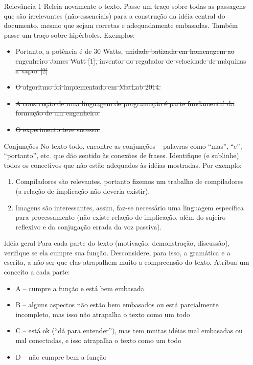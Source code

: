 \documentclass{beamer}
\begin{document}
\begin{frame}[fragile]{Relevância 1}
  \centering
  \large
  Releia novamente o texto. Passe um traço sobre todas as passagens que são
  irrelevantes (não-essenciais) para a construção da idéia central do documento,
  mesmo que sejam corretas e adequadamente embasadas. Também passe um traço
  sobre hipérboles. Exemplos:
  \begin{itemize}
    \item Portanto, a potência é de 30 Watts, \sout{unidade batizada em homenagem ao engenheiro
      James Watt [1], inventor do regulador de velocidade de máquinas a vapor [2]}
    \item \sout{O algoritmo foi implementado em MatLab 2014.}
    \item \sout{A construção de uma linguagem de programação é parte fundamental da
      formação de um engenheiro.}
    \item \sout{O experimento teve sucesso.}
  \end{itemize}
\end{frame}

\begin{frame}[fragile]{Conjunções}
  \centering
  \large
  No texto todo, encontre as conjunções -- palavras como ``mas'', ``e'',
  ``portanto'', etc. que dão sentido às conexões de frases. Identifique (e
  sublinhe) todos os conectivos que não estão adequados às idéias mostradas. Por
  exemplo:
  \begin{enumerate}
    \item Compiladores são relevantes, portanto fizemos um trabalho de
      compiladores (a relação de implicação não deveria existir).
    \item Imagens são interessantes, assim, faz-se necessário uma linguagem
      específica para processamento (não existe relação de implicação, além do
      sujeiro reflexivo e da conjugação errada da voz passiva).
  \end{enumerate}
\end{frame}

\begin{frame}[fragile]{Idéia geral}
  \centering
  \large
  Para cada parte do texto (motivação, demonstração, discussão), verifique se
  ela cumpre sua função. Desconsidere, para isso, a gramática e a escrita, a não
  ser que elas atrapalhem muito a compreensão do texto. Atribua um conceito a
  cada parte:

  \begin{itemize}
    \item A -- cumpre a função e está bem embasada
    \item B -- alguns aspectos não estão bem embasados ou está parcialmente
      incompleto, mas isso não atrapalha o texto como um todo
    \item C -- está ok (``dá para entender''), mas tem muitas idéias mal
      embasadas ou mal conectadas, e isso atrapalha o texto como um todo
    \item D -- não cumpre bem a função
  \end{itemize}

\end{frame}
\end{document}
